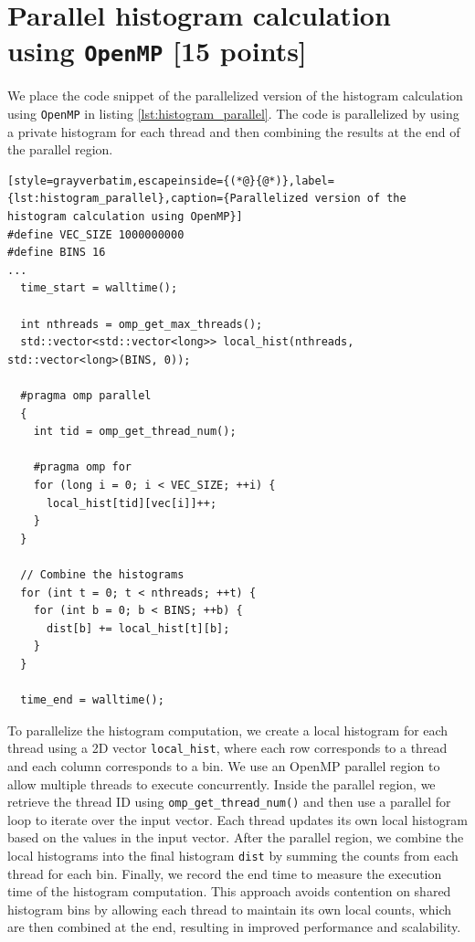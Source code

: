 \documentclass[unicode,10pt,a4paper,oneside,numbers=endperiod,openany]{scrartcl}
\begin{document}
\section{Parallel histogram calculation using \texttt{OpenMP} [15 points]}
We place the code snippet of the parallelized version of the histogram calculation using \texttt{OpenMP} in listing \ref{lst:histogram_parallel}. The code is parallelized by using a private histogram for each thread and then combining the results at the end of the parallel region.
\begin{lstlisting}[style=grayverbatim,escapeinside={(*@}{@*)},label={lst:histogram_parallel},caption={Parallelized version of the histogram calculation using OpenMP}]
#define VEC_SIZE 1000000000
#define BINS 16
...
  time_start = walltime();

  int nthreads = omp_get_max_threads();
  std::vector<std::vector<long>> local_hist(nthreads, std::vector<long>(BINS, 0));

  #pragma omp parallel
  {
    int tid = omp_get_thread_num();

    #pragma omp for
    for (long i = 0; i < VEC_SIZE; ++i) {
      local_hist[tid][vec[i]]++;
    }
  }

  // Combine the histograms
  for (int t = 0; t < nthreads; ++t) {
    for (int b = 0; b < BINS; ++b) {
      dist[b] += local_hist[t][b];
    }
  }

  time_end = walltime();
\end{lstlisting}
To parallelize the histogram computation, we create a local histogram for each thread using a 2D vector \texttt{local\_hist}, where each row corresponds to a thread and each column corresponds to a bin. We use an OpenMP parallel region to allow multiple threads to execute concurrently. Inside the parallel region, we retrieve the thread ID using \texttt{omp\_get\_thread\_num()} and then use a parallel for loop to iterate over the input vector. Each thread updates its own local histogram based on the values in the input vector. After the parallel region, we combine the local histograms into the final histogram \texttt{dist} by summing the counts from each thread for each bin. Finally, we record the end time to measure the execution time of the histogram computation. This approach avoids contention on shared histogram bins by allowing each thread to maintain its own local counts, which are then combined at the end, resulting in improved performance and scalability.\\
\end{document}
